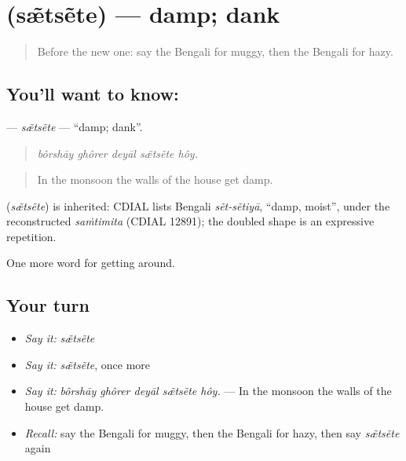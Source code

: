 \section[\texorpdfstring{\bn{স্যাঁতসেঁতে} (sæ̃tsẽte)}{স্যাঁতসেঁতে (sæ̃tsẽte)}]{ (sæ̃tsẽte) — damp; dank}

\label{lesson:BN-C428-setsete}



\begin{quote}
Before the new one: say the Bengali for muggy, then the Bengali for hazy.
\end{quote}

\subsection*{You'll want to know: }
\textbf{} — \emph{sæ̃tsẽte} — \textquotedblleft{}damp; dank\textquotedblright{}.

\begin{quote}
    
\end{quote}

\begin{quote}
\emph{bôrshāy ghôrer deyāl sæ̃tsẽte hôy.}
\end{quote}

\begin{quote}
In the monsoon the walls of the house get damp.
\end{quote}

\begin{cousinweb}
\textbf{} (\emph{sæ̃tsẽte}) is inherited: CDIAL lists Bengali \emph{sẽt-sẽtiyā}, \textquotedblleft{}damp, moist\textquotedblright{}, under the reconstructed \emph{saṁtimita} (CDIAL 12891); the doubled shape is an expressive repetition.
\end{cousinweb}

\begin{grammarlens}[title={What you've built}]
One more word for getting around.
\end{grammarlens}

\subsection*{Your turn}
\begin{itemize}
\raggedright
  \item \emph{Say it:} \emph{sæ̃tsẽte}
  \item \emph{Say it:} \emph{sæ̃tsẽte}, once more
  \item \emph{Say it:} \emph{bôrshāy ghôrer deyāl sæ̃tsẽte hôy.} — In the monsoon the walls of the house get damp.
  \item \emph{Recall:} say the Bengali for muggy, then the Bengali for hazy, then say \emph{sæ̃tsẽte} again
\end{itemize}

